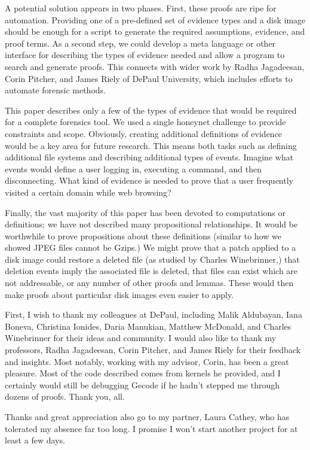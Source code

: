 \documentclass[nocopyrightspace]{sigplanconf}
\begin{document}
A potential solution appears in two phases. First, these proofs are ripe for
automation. Providing one of a pre-defined set of evidence types and a disk
image should be enough for a script to generate the required assumptions,
evidence, and proof terms. As a second step, we could develop a meta language
or other interface for describing the types of evidence needed and allow a
program to search and generate proofs. This connects with wider work by Radha
Jagadeesan, Corin Pitcher, and James Riely of DePaul University, which
includes efforts to automate forensic methods.

This paper describes only a few of the types of evidence that would be
required for a complete forensics tool. We used a single honeynet challenge to
provide constraints and scope. Obviously, creating additional definitions of
evidence would be a key area for future research. This means both tasks such
as defining additional file systems and describing additional types of events.
Imagine what events would define a user logging in, executing a command, and
then disconnecting. What kind of evidence is needed to prove that a user
frequently visited a certain domain while web browsing?

Finally, the vast majority of this paper has been devoted to computations or
definitions; we have not described many propositional relationships. It would
be worthwhile to prove propositions about these definitions (similar to how we
showed JPEG files cannot be Gzips.) We might prove that a patch applied to a
disk image could restore a deleted file (as studied by Charles Winebrinner,)
that deletion events imply the associated file is deleted, that files can
exist which are not addressable, or any number of other proofs and lemmas.
These would then make proofs about particular disk images even easier to
apply.

\acks
First, I wish to thank my colleagues at DePaul, including Malik Aldubayan,
Iana Boneva, Christina Ionides, Daria Manukian, Matthew McDonald, and Charles
Winebrinner for their ideas and community. I would also like to thank my
professors, Radha Jagadeesan, Corin Pitcher, and James Riely for their
feedback and insights. Most notably, working with my advisor, Corin, has been
a great pleasure. Most of the code described comes from kernels he provided,
and I certainly would still be debugging Gecode if he hadn't stepped me
through dozens of proofs. Thank you, all.

Thanks and great appreciation also go to my partner, Laura Cathey, who has
tolerated my absence far too long. I promise I won't start another project for
at least a few days.
\end{document}
